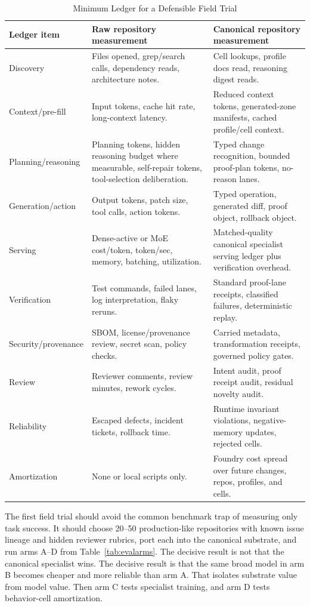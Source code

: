 \begin{table}[t]
\caption{Minimum Ledger for a Defensible Field Trial}
\label{tab:cost-ledger}
\centering
\footnotesize
\begin{tabularx}{\textwidth}{p{}X X}
\toprule
Ledger item & Raw repository measurement & Canonical repository measurement \\
\midrule
Discovery & Files opened, grep/search calls, dependency reads, architecture notes. & Cell lookups, profile docs read, reasoning digest reads. \\
Context/pre-fill & Input tokens, cache hit rate, long-context latency. & Reduced context tokens, generated-zone manifests, cached profile/cell context. \\
Planning/reasoning & Planning tokens, hidden reasoning budget where measurable, self-repair tokens, tool-selection deliberation. & Typed change recognition, bounded proof-plan tokens, no-reason lanes. \\
Generation/action & Output tokens, patch size, tool calls, action tokens. & Typed operation, generated diff, proof object, rollback object. \\
Serving & Dense-active or MoE cost/token, token/sec, memory, batching, utilization. & Matched-quality canonical specialist serving ledger plus verification overhead. \\
Verification & Test commands, failed lanes, log interpretation, flaky reruns. & Standard proof-lane receipts, classified failures, deterministic replay. \\
Security/provenance & SBOM, license/provenance review, secret scan, policy checks. & Carried metadata, transformation receipts, governed policy gates. \\
Review & Reviewer comments, review minutes, rework cycles. & Intent audit, proof receipt audit, residual novelty audit. \\
Reliability & Escaped defects, incident tickets, rollback time. & Runtime invariant violations, negative-memory updates, rejected cells. \\
Amortization & None or local scripts only. & Foundry cost spread over future changes, repos, profiles, and cells. \\
\bottomrule
\end{tabularx}
\end{table}

The first field trial should avoid the common benchmark trap of measuring only task success. It should choose 20--50 production-like repositories with known issue lineage and hidden reviewer rubrics, port each into the canonical substrate, and run arms A--D from Table~\ref{tab:evalarms}. The decisive result is not that the canonical specialist wins. The decisive result is that the same broad model in arm B becomes cheaper and more reliable than arm A. That isolates substrate value from model value. Then arm C tests specialist training, and arm D tests behavior-cell amortization.

